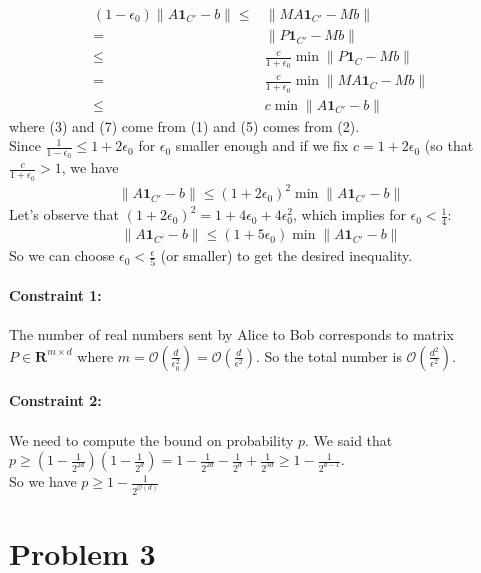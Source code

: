 \documentclass[a4paper, 11pt]{article}
\begin{document}
\begin{align}
    (1-\epsilon_0)\lVert A\mathbf{1}_{C'} - b\rVert\leq{}&\lVert MA\mathbf{1}_{C'} - Mb\rVert\\
    ={}&\lVert P\mathbf{1}_{C'} - Mb\rVert\\
    \leq{}& \frac{c}{1+\epsilon_0}\min \lVert P\mathbf{1}_{C}-Mb\rVert\\
    ={}& \frac{c}{1+\epsilon_0}\min \lVert MA\mathbf{1}_{C}-Mb\rVert\\
    \leq{}& c\min\lVert A\mathbf{1}_{C'} - b\rVert
\end{align}
where (3) and (7) come from (1) and (5) comes from (2).\\
Since $\frac{1}{1-\epsilon_0}\leq 1+2\epsilon_0$ for $\epsilon_0$ smaller  enough and if we fix $c=1+2\epsilon_0$ (so that $\frac{c}{1+\epsilon_0}>1$, we have
\begin{align}
    \lVert A\mathbf{1}_{C'} - b\rVert\leq (1+2\epsilon_0)^2\min\lVert A\mathbf{1}_{C'} - b\rVert
\end{align}
Let's observe that $(1+2\epsilon_0)^2=1+4\epsilon_0+4\epsilon_0^2$, which implies for $\epsilon_0<\frac{1}{4}$:
\begin{align}
    \lVert A\mathbf{1}_{C'} - b\rVert\leq (1+5\epsilon_0)\min\lVert A\mathbf{1}_{C'} - b\rVert
\end{align}
So we can choose $\epsilon_0<\frac{\epsilon}{5}$ (or smaller) to get the desired inequality.
\\\\
\textbf{Constraint 1:}\\\\
The number of real numbers sent by Alice to Bob corresponds to matrix $P\in\mathbf{R}^{m\times d}$ where $m=\mathcal{O}\left(\frac{d}{\epsilon_0^2}\right)=\mathcal{O}\left(\frac{d}{\epsilon^2}\right)$. So the total number is $\mathcal{O}\left(\frac{d^2}{\epsilon^2}\right)$.
\\\\
\textbf{Constraint 2:}\\\\
We need to compute the bound on probability $p$. We said that $p\geq(1-\frac{1}{2^{2d}})(1-\frac{1}{2^d})=1-\frac{1}{2^{2d}}-\frac{1}{2^d}+\frac{1}{2^{3d}}\geq 1-\frac{1}{2^{d-1}}$.\\
So we have $p\geq 1-\frac{1}{2^{\mathcal{O}(d)}}$


\newpage

\section*{Problem 3}
\end{document}
